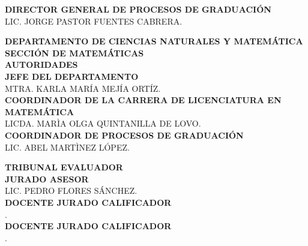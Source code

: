 \begin{center}
\begin{large}
		\textbf{DIRECTOR GENERAL DE PROCESOS DE GRADUACIÓN}\\
		LIC. JORGE PASTOR FUENTES CABRERA.\\
	\end{large}
	\newpage 
	\thispagestyle{empty}%
	\begin{large}
		\textbf{
			DEPARTAMENTO DE CIENCIAS NATURALES Y MATEMÁTICA\\
			\vspace{0.5in} 
			SECCIÓN DE MATEMÁTICAS\\
			\vspace{0.8in}
			AUTORIDADES\\
			\vspace{1.0in}	
		}
		\textbf{JEFE DEL DEPARTAMENTO}\\
		 MTRA. KARLA MARÍA MEJÍA ORTÍZ.\\
		\vspace{1.0in}
		\textbf{COORDINADOR DE LA CARRERA DE LICENCIATURA EN MATEMÁTICA}\\
		LICDA. MARÌA OLGA QUINTANILLA DE LOVO.\\
		\vspace{1.0in}
		\textbf{COORDINADOR DE PROCESOS DE GRADUACIÓN}\\
		LIC. ABEL MARTÌNEZ LÓPEZ.\\
	\end{large}
	\newpage
	\thispagestyle{empty}%
	\begin{large}
		\textbf{TRIBUNAL EVALUADOR}\\
		\vspace{1.5in}
		\textbf{JURADO ASESOR}\\
		LIC. PEDRO FLORES SÁNCHEZ.\\
		\vspace{2.0in}
		\textbf{DOCENTE JURADO CALIFICADOR}\\
		.\\
		\vspace{2.0in}
		\textbf{DOCENTE JURADO CALIFICADOR}\\
		.\\	
	\end{large}
\end{center}
